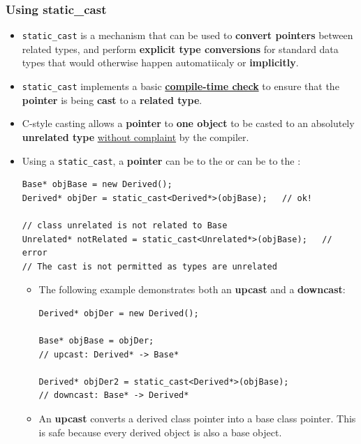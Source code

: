 \documentclass[10pt]{article}
\newcommand{\pbreak}{\vspace{30pt}}
\begin{document}
\subsubsection{Using static\_cast}
\begin{itemize}
	\item \verb|static_cast| is a mechanism that can be used to \textbf{convert pointers} between related types, and perform \textbf{explicit type conversions} for standard data types that would otherwise happen automatiicaly or \textbf{implicitly}.

	\item \verb|static_cast| implements a basic \textbf{\underline{compile-time check}} to ensure that the \textbf{pointer} is being \textbf{cast} to a \textbf{related type}.

	\item C-style casting allows a \textbf{pointer} to \textbf{one object} to be casted to an absolutely \textbf{unrelated type} \underline{without complaint} by the compiler.

		\pbreak

	\item Using a \verb|static_cast|, a \textbf{pointer} can be  to the  or can be  to the :

		\begin{verbatim}
Base* objBase = new Derived();
Derived* objDer = static_cast<Derived*>(objBase);	// ok!

// class unrelated is not related to Base
Unrelated* notRelated = static_cast<Unrelated*>(objBase);	// error
// The cast is not permitted as types are unrelated
		\end{verbatim}


		\begin{itemize}
    \item The following example demonstrates both an \textbf{upcast} and a \textbf{downcast}:

\begin{verbatim}
Derived* objDer = new Derived();

Base* objBase = objDer;
// upcast: Derived* -> Base*

Derived* objDer2 = static_cast<Derived*>(objBase);
// downcast: Base* -> Derived*
\end{verbatim}

    \item An \textbf{upcast} converts a derived class pointer into a base class pointer. This is safe because every derived object is also a base object.


\end{itemize}
\end{itemize}
\end{document}
